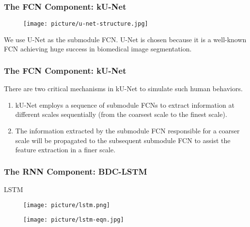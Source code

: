 \documentclass{beamer}
\begin{document}


\begin{frame}
  \frametitle{The FCN Component: kU-Net}
  \begin{figure}[!htb]
    \centering
    \texttt{[image: picture/u-net-structure.jpg]}
  \end{figure}
  We use U-Net as the submodule FCN. U-Net is chosen
    because it is a well-known FCN achieving huge success in biomedical image segmentation.
  
\end{frame}

\begin{frame}
  \frametitle{The FCN Component: kU-Net}
  There are two critical mechanisms in kU-Net to simulate such human behaviors.
  \begin{enumerate}
  \item kU-Net employs a sequence of submodule FCNs to extract information at different scales sequentially
    (from the coarsest scale to the finest scale). 
  \item The information extracted by the submodule FCN responsible for a coarser scale will be propagated to
    the subsequent submodule FCN to assist the feature extraction in a finer scale.
  \end{enumerate}
\end{frame}  


\begin{frame}
  \frametitle{The RNN Component: BDC-LSTM}
  LSTM
  \begin{figure}[ht]
    \centering
    \begin{minipage}{.5\textwidth}
      \centering
      \texttt{[image: picture/lstm.png]}
    \end{minipage}%
    \begin{minipage}{.5\textwidth}
      \centering
      \texttt{[image: picture/lstm-eqn.jpg]}
    \end{minipage}
  \end{figure}
\end{frame}
\end{document}

